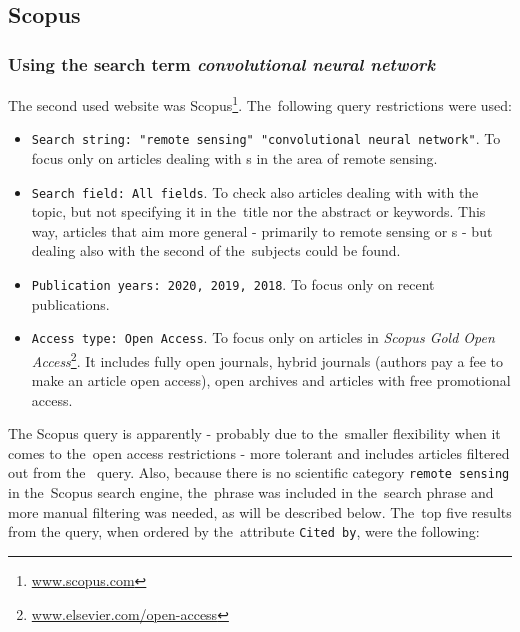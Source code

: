
\subsection{Scopus}
\label{scopus-papers}

\subsubsection{Using the search term \textit{convolutional neural network}}
\label{scopus-papers-full-length}

The second used website was Scopus\footnote{\url{www.scopus.com}}. The~following query restrictions were used:

\begin{itemize}
	\item \verb|Search string: "remote sensing" "convolutional neural network"|. To focus only on articles dealing with s in the area of remote sensing.
	\item \verb|Search field: All fields|. To check also articles dealing with with the topic, but not specifying it in the~title nor the abstract or keywords. This way, articles that aim more general - primarily to remote sensing or s - but dealing also with the second of the~subjects could be found.
	\item \verb|Publication years: 2020, 2019, 2018|. To focus only on recent publications.
	\item \verb|Access type: Open Access|. To focus only on articles in \textit{Scopus Gold Open Access}\footnote{\url{www.elsevier.com/open-access}}. It includes fully open journals, hybrid journals (authors pay a fee to make an article open access), open archives and articles with free promotional access.
\end{itemize}

\noindent The Scopus query is apparently - probably due to the~smaller flexibility when it comes to the~open access restrictions - more tolerant and includes articles filtered out from the~ query. Also, because there is no scientific category \verb|remote sensing| in the~Scopus search engine, the~phrase was included in the~search phrase and more manual filtering was needed, as will be described below. The~top five results from the query, when ordered by the~attribute \verb|Cited by|, were the following:

